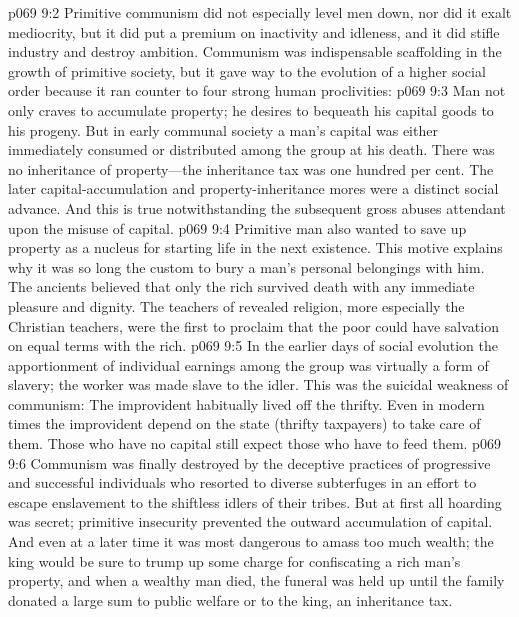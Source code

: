 \pc \vs p069 9:2 Primitive communism did not especially level men down, nor did it exalt mediocrity, but it did put a premium on inactivity and idleness, and it did stifle industry and destroy ambition. Communism was indispensable scaffolding in the growth of primitive society, but it gave way to the evolution of a higher social order because it ran counter to four strong human proclivities:
\pc \vs p069 9:3 \bibnobreakspace {} Man not only craves to accumulate property; he desires to bequeath his capital goods to his progeny. But in early communal society a man’s capital was either immediately consumed or distributed among the group at his death. There was no inheritance of property---the inheritance tax was one hundred per cent. The later capital\hyp{}accumulation and property\hyp{}inheritance mores were a distinct social advance. And this is true notwithstanding the subsequent gross abuses attendant upon the misuse of capital.
\pc \vs p069 9:4 \bibnobreakspace {} Primitive man also wanted to save up property as a nucleus for starting life in the next existence. This motive explains why it was so long the custom to bury a man’s personal belongings with him. The ancients believed that only the rich survived death with any immediate pleasure and dignity. The teachers of revealed religion, more especially the Christian teachers, were the first to proclaim that the poor could have salvation on equal terms with the rich.
\pc \vs p069 9:5 \bibnobreakspace {} In the earlier days of social evolution the apportionment of individual earnings among the group was virtually a form of slavery; the worker was made slave to the idler. This was the suicidal weakness of communism: The improvident habitually lived off the thrifty. Even in modern times the improvident depend on the state (thrifty taxpayers) to take care of them. Those who have no capital still expect those who have to feed them.
\pc \vs p069 9:6 \bibnobreakspace {} Communism was finally destroyed by the deceptive practices of progressive and successful individuals who resorted to diverse subterfuges in an effort to escape enslavement to the shiftless idlers of their tribes. But at first all hoarding was secret; primitive insecurity prevented the outward accumulation of capital. And even at a later time it was most dangerous to amass too much wealth; the king would be sure to trump up some charge for confiscating a rich man’s property, and when a wealthy man died, the funeral was held up until the family donated a large sum to public welfare or to the king, an inheritance tax.
